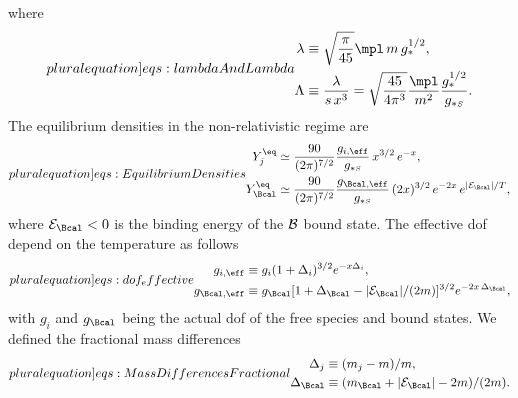 \documentclass[preprint,5p,twocolumn]{elsarticle}
\begin{document}
%
where 
%
\begin{subequations}
\label{eq:lambdaAndLambda}
\label[pluralequation]{eqs:lambdaAndLambda}
\begin{align}
\lambda &\equiv 
\sqrt{\frac{\pi}{45}}\mpl \, m \, g_{*}^{1/2} ,
\label{eq:lambda}
\\
\Lambda &\equiv \dfrac{\lambda}{s \, x^3} 
=\sqrt{\frac{45}{4\pi^3}} \frac{\mpl}{m^2} \frac{g_{*}^{1/2}}{g_{*\mathsmaller{S}}} .
\label{eq:Lambda}
\end{align}
\end{subequations}
%
The equilibrium densities in the non-relativistic regime are
%
\begin{subequations}
\label{eq:EquilibriumDensities}
\label[pluralequation]{eqs:EquilibriumDensities}	
\begin{align}
Y_j^\eq &\simeq \frac{90}{(2\pi)^{7/2}} 
\frac{g_{i,\eff}}{g_{*\mathsmaller{S}}} 
\, x^{3/2} \, e^{-x} ,
\label{eq:Yeq_i}
\\
Y_{\Bcal}^\eq &\simeq \frac{90}{(2\pi)^{7/2}} 
\frac{g_{\Bcal,\eff}}{g_{*\mathsmaller{S}}} 
\, (2x)^{3/2} 
\, e^{-2x} \, e^{|{\cal E}_{\Bcal}|/T} ,
\label{eq:Yeq_B}
\end{align}
\end{subequations}
%
where ${\cal E}_{\Bcal}<0$ is the binding energy of the ${\cal B}$ bound state.
The effective dof depend on the temperature as follows
%
\begin{subequations}
\label{eq:dof_effective}
\label[pluralequation]{eqs:dof_effective}
\begin{align}
g_{i,\eff} &\equiv g_i (1+\Delta_i)^{3/2} e^{-x\Delta_i} ,
\label{eq:dof_effective_FreeSpecies} 
\\
g_{\Bcal,\eff} &\equiv g_{\Bcal} [1+\Delta_{\Bcal} - |{\cal E}_{\Bcal}|/(2m)]^{3/2} 
e^{-2x \, \Delta_{\Bcal}} ,
\label{eq:dof_effective_BoundStates}
\end{align}
\end{subequations}
%
with $g_i$ and $g_{\Bcal}$ being the actual dof of the free species and bound states. We defined the fractional mass differences
%
\begin{subequations}
\label{eq:MassDifferencesFractional}
\label[pluralequation]{eqs:MassDifferencesFractional}
\begin{align}
\Delta_j &\equiv (m_j - m)/m , 
\label{eq:MassDifferencesFractional_Free}
\\
\Delta_{\Bcal} &\equiv (m_{\Bcal} + |{\cal E}_{\Bcal}| - 2m)/(2m) .
\label{eq:MassDifferencesFractional_Bound}
\end{align}
\end{subequations}
\end{document}
